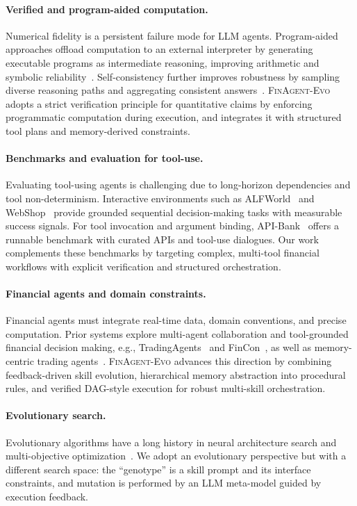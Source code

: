 \documentclass{article}
\begin{document}
\paragraph{Verified and program-aided computation.}
Numerical fidelity is a persistent failure mode for LLM agents. Program-aided approaches offload computation to an external interpreter by generating executable programs as intermediate reasoning, improving arithmetic and symbolic reliability~\citep{gao2022pal,chen2022pot}. Self-consistency further improves robustness by sampling diverse reasoning paths and aggregating consistent answers~\citep{wang2023selfconsistency}. \textsc{FinAgent-Evo} adopts a strict verification principle for quantitative claims by enforcing programmatic computation during execution, and integrates it with structured tool plans and memory-derived constraints.

\paragraph{Benchmarks and evaluation for tool-use.}
Evaluating tool-using agents is challenging due to long-horizon dependencies and tool non-determinism. Interactive environments such as ALFWorld~\citep{shridhar2021alfworld} and WebShop~\citep{yao2022webshop} provide grounded sequential decision-making tasks with measurable success signals. For tool invocation and argument binding, API-Bank~\citep{li2023apibank} offers a runnable benchmark with curated APIs and tool-use dialogues. Our work complements these benchmarks by targeting complex, multi-tool financial workflows with explicit verification and structured orchestration.

\paragraph{Financial agents and domain constraints.}
Financial agents must integrate real-time data, domain conventions, and precise computation. Prior systems explore multi-agent collaboration and tool-grounded financial decision making, e.g., TradingAgents~\citep{tradingagents2024} and FinCon~\citep{fincon2024}, as well as memory-centric trading agents~\citep{finmem2023}. \textsc{FinAgent-Evo} advances this direction by combining feedback-driven skill evolution, hierarchical memory abstraction into procedural rules, and verified DAG-style execution for robust multi-skill orchestration.

\paragraph{Evolutionary search.}
Evolutionary algorithms have a long history in neural architecture search and multi-objective optimization~\citep{evolutionary_nas_survey2021}. We adopt an evolutionary perspective but with a different search space: the ``genotype'' is a skill prompt and its interface constraints, and mutation is performed by an LLM meta-model guided by execution feedback.
\end{document}
